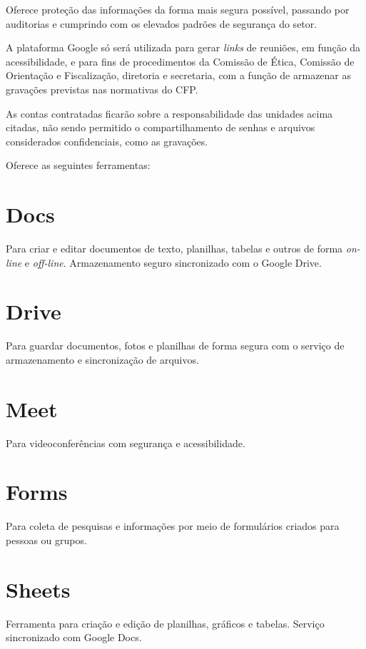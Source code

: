 \documentclass[openright, twoside, a4paper]{memoir}
\begin{document}
Oferece proteção das informações da forma mais segura possível, passando
por auditorias e cumprindo com os elevados padrões de segurança do
setor.

A plataforma Google só será utilizada para gerar \emph{links} de
reuniões, em função da acessibilidade, e para fins de procedimentos da
Comissão de Ética, Comissão de Orientação e Fiscalização, diretoria e
secretaria, com a função de armazenar as gravações previstas nas
normativas do CFP.

As contas contratadas ficarão sobre a responsabilidade das unidades
acima citadas, não sendo permitido o compartilhamento de senhas e
arquivos considerados confidenciais, como as gravações.

Oferece as seguintes ferramentas:

\section{Docs}

Para criar e editar documentos de texto, planilhas, tabelas e outros de
forma \emph{on-line} e \emph{off-line}. Armazenamento seguro
sincronizado com o Google Drive.

\section{Drive}

Para guardar documentos, fotos e planilhas de forma segura com o serviço
de armazenamento e sincronização de arquivos.

\section{Meet}

Para videoconferências com segurança e acessibilidade.

\section{Forms}

Para coleta de pesquisas e informações por meio de formulários criados
para pessoas ou grupos.

\section{Sheets}

Ferramenta para criação e edição de planilhas, gráficos e tabelas.
Serviço sincronizado com Google Docs.
\end{document}

